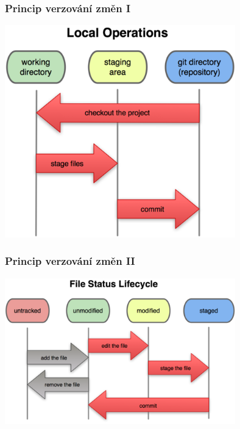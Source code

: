\documentclass[10pt, xcolor=dvipsnames]{beamer} %
\begin{document}
\begin{frame}
  \frametitle{Princip verzování změn I}
  
  \vspace{10pt}
  \centering
  \includegraphics[width=0.75\textwidth]{staging_index.png}

\end{frame}
\begin{frame}
  \frametitle{Princip verzování změn II}
  
  \vspace{10pt}
  \centering
  \includegraphics[width=0.75\textwidth]{file_lifecycle.png}

\end{frame}
\end{document}
